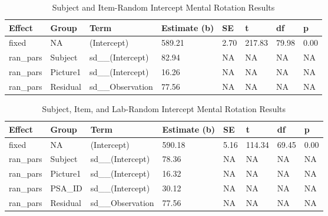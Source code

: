 \documentclass[
  man,floatsintext]{apa7}
\begin{document}
\begin{table}[tbp]

\begin{center}
\begin{threeparttable}

\caption{\label{tab:item_e}Subject and Item-Random Intercept Mental Rotation Results}

\begin{tabular}{llllllll}
\toprule
Effect & Group & Term & Estimate (b) & SE & t & df & p\\
\midrule
fixed & NA & (Intercept) & 589.21 & 2.70 & 217.83 & 79.98 & 0.00\\
ran\_pars & Subject & sd\_\_(Intercept) & 82.94 & NA & NA & NA & NA\\
ran\_pars & Picture1 & sd\_\_(Intercept) & 16.26 & NA & NA & NA & NA\\
ran\_pars & Residual & sd\_\_Observation & 77.56 & NA & NA & NA & NA\\
\bottomrule
\end{tabular}

\end{threeparttable}
\end{center}

\end{table}

\begin{table}[tbp]

\begin{center}
\begin{threeparttable}

\caption{\label{tab:lab_e}Subject, Item, and Lab-Random Intercept Mental Rotation Results}

\begin{tabular}{llllllll}
\toprule
Effect & Group & Term & Estimate (b) & SE & t & df & p\\
\midrule
fixed & NA & (Intercept) & 590.18 & 5.16 & 114.34 & 69.45 & 0.00\\
ran\_pars & Subject & sd\_\_(Intercept) & 78.36 & NA & NA & NA & NA\\
ran\_pars & Picture1 & sd\_\_(Intercept) & 16.32 & NA & NA & NA & NA\\
ran\_pars & PSA\_ID & sd\_\_(Intercept) & 30.12 & NA & NA & NA & NA\\
ran\_pars & Residual & sd\_\_Observation & 77.56 & NA & NA & NA & NA\\
\bottomrule
\end{tabular}

\end{threeparttable}
\end{center}

\end{table}
\end{document}
